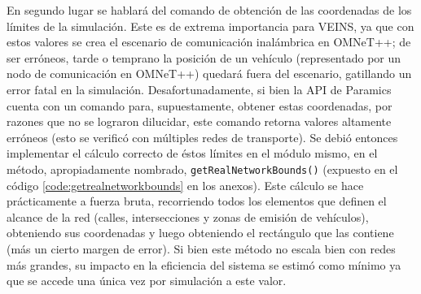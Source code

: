 En segundo lugar se hablará del comando de obtención de las coordenadas de los límites de la simulación. Este es de extrema importancia para VEINS, ya que con estos valores se crea el escenario de comunicación inalámbrica en OMNeT++; de ser erróneos, tarde o temprano la posición de un vehículo (representado por un nodo de comunicación en OMNeT++) quedará fuera del escenario, gatillando un error fatal en la simulación. 
Desafortunadamente, si bien la API de Paramics cuenta con un comando para, supuestamente, obtener estas coordenadas, por razones que no se lograron dilucidar, este comando retorna valores altamente erróneos (esto se verificó con múltiples redes de transporte).
Se debió entonces implementar el cálculo correcto de éstos límites en el módulo mismo, en el método, apropiadamente nombrado, \texttt{getRealNetworkBounds()} (expuesto en el código \ref{code:getrealnetworkbounds} en los anexos). Este cálculo se hace prácticamente a fuerza bruta, recorriendo todos los elementos que definen el alcance de la red (calles, intersecciones y zonas de emisión de vehículos), obteniendo sus coordenadas y luego obteniendo el rectángulo que las contiene (más un cierto margen de error).
Si bien este método no escala bien con redes más grandes, su impacto en la eficiencia del sistema se estimó como mínimo ya que se accede una única vez por simulación a este valor.